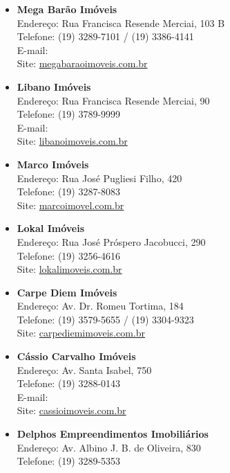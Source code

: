 \begin{itemize}
    \item   \textbf{Mega Barão Imóveis}
        \\Endereço: Rua Francisca Resende Merciai, 103 B
        \\Telefone: (19) 3289-7101 / (19) 3386-4141
        \\E-mail: 
        \\Site: \url{megabaraoimoveis.com.br}

    \item   \textbf{Libano Imóveis}
        \\Endereço: Rua Francisca Resende Merciai, 90
        \\Telefone: (19) 3789-9999
        \\E-mail: 
        \\Site: \url{libanoimoveis.com.br}

    \item   \textbf{Marco Imóveis}
        \\Endereço: Rua José Pugliesi Filho, 420
        \\Telefone: (19) 3287-8083
        \\Site: \url{marcoimovel.com.br}

    \item   \textbf{Lokal Imóveis}
        \\Endereço: Rua José Próspero Jacobucci, 290
        \\Telefone: (19) 3256-4616
        \\Site: \url{lokalimoveis.com.br}

    \item   \textbf{Carpe Diem Imóveis}
        \\Endereço: Av. Dr. Romeu Tortima, 184
        \\Telefone: (19) 3579-5655 / (19) 3304-9323
        \\Site: \url{carpediemimoveis.com.br}

    \item   \textbf{Cássio Carvalho Imóveis}
        \\Endereço: Av. Santa Isabel, 750
        \\Telefone: (19) 3288-0143
        \\E-mail: 
        \\Site: \url{cassioimoveis.com.br}

    \item   \textbf{Delphos Empreendimentos Imobiliários}
        \\Endereço: Av. Albino J. B. de Oliveira, 830
        \\Telefone: (19) 3289-5353


\end{itemize}
